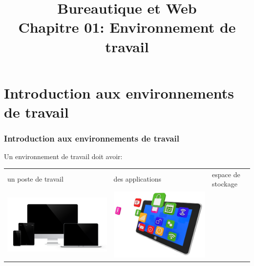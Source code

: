 \documentclass[xcolor=table]{beamer}
\title[BWEB: 01- Environnement] %
{Bureautique et Web \\Chapitre 01: Environnement de travail}
\begin{document}
\section{Introduction aux environnements de travail}

\begin{frame}
\frametitle{Introduction aux environnements de travail}

Un environnement de travail doit avoir:

\begin{center}
	\begin{tabular}{p{}p{}p{}}
	un poste de travail & des applications & espace de stockage \\
	\includegraphics[height=.25\textheight]{..//img/Bweb01-environnement/poste-travail.png}&
	\includegraphics[height=.25\textheight]{..//img/Bweb01-environnement/applications.jpg}&

\end{tabular}
\end{center}
\end{frame}
\end{document}
